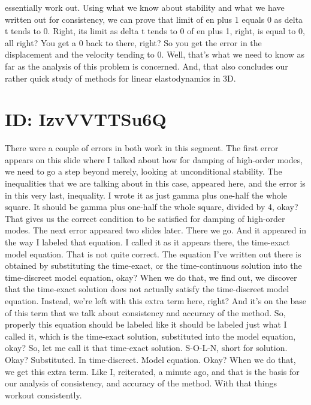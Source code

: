 \documentclass[10pt]{article}
\begin{document}
essentially work out. Using what we know about stability and what we have written out for consistency, we can prove that limit of en plus 1 equals 0 as delta t tends to 0. Right, its limit as delta t tends to 0 of en plus 1, right, is equal to 0, all right? You get a 0 back to there, right? So you get the error in the displacement and the velocity tending to 0. Well, that's what we need to know as far as the analysis of this problem is concerned. And, that also concludes our rather quick study of methods for linear elastodynamics in 3D.

\section*{ID: IzvVVTTSu6Q}
There were a couple of errors in both work in this segment. The first error appears on this slide where I talked about how for damping of high-order modes, we need to go a step beyond merely, looking at unconditional stability. The inequalities that we are talking about in this case, appeared here, and the error is in this very last, inequality. I wrote it as just gamma plus one-half the whole square. It should be gamma plus one-half the whole square, divided by 4, okay? That gives us the correct condition to be satisfied for damping of high-order modes. The next error appeared two slides later. There we go. And it appeared in the way I labeled that equation. I called it as it appears there, the time-exact model equation. That is not quite correct. The equation I've written out there is obtained by substituting the time-exact, or the time-continuous solution into the time-discreet model equation, okay? When we do that, we find out, we discover that the time-exact solution does not actually satisfy the time-discreet model equation. Instead, we're left with this extra term here, right? And it's on the base of this term that we talk about consistency and accuracy of the method. So, properly this equation should be labeled like it should be labeled just what I called it, which is the time-exact solution, substituted into the model equation, okay? So, let me call it that time-exact solution. S-O-L-N, short for solution. Okay? Substituted. In time-discreet. Model equation. Okay? When we do that, we get this extra term. Like I, reiterated, a minute ago, and that is the basis for our analysis of consistency, and accuracy of the method. With that things workout consistently.
\end{document}

